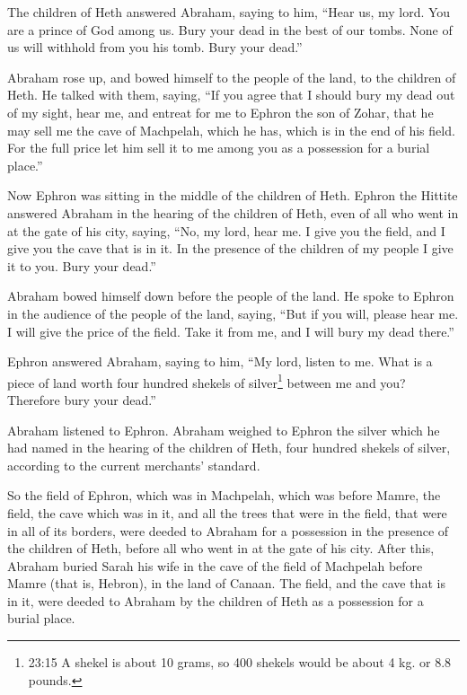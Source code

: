 \myverse{}The children of Heth answered Abraham, saying to him, \myverse{}“Hear us, my lord. You are a prince of God among us. Bury your dead in the best of our tombs. None of us will withhold from you his tomb. Bury your dead.”

\myverse{}Abraham rose up, and bowed himself to the people of the land, to the children of Heth. \myverse{}He talked with them, saying, “If you agree that I should bury my dead out of my sight, hear me, and entreat for me to Ephron the son of Zohar, \myverse{}that he may sell me the cave of Machpelah, which he has, which is in the end of his field. For the full price let him sell it to me among you as a possession for a burial place.”

\myverse{}Now Ephron was sitting in the middle of the children of Heth. Ephron the Hittite answered Abraham in the hearing of the children of Heth, even of all who went in at the gate of his city, saying, \myverse{}“No, my lord, hear me. I give you the field, and I give you the cave that is in it. In the presence of the children of my people I give it to you. Bury your dead.”

\myverse{}Abraham bowed himself down before the people of the land. \myverse{}He spoke to Ephron in the audience of the people of the land, saying, “But if you will, please hear me. I will give the price of the field. Take it from me, and I will bury my dead there.”

\myverse{}Ephron answered Abraham, saying to him, \myverse{}“My lord, listen to me. What is a piece of land worth four hundred shekels of silver\footnote{23:15 A shekel is about 10 grams, so 400 shekels would be about 4 kg. or 8.8 pounds.} between me and you? Therefore bury your dead.”

\myverse{}Abraham listened to Ephron. Abraham weighed to Ephron the silver which he had named in the hearing of the children of Heth, four hundred shekels of silver, according to the current merchants’ standard.

\myverse{}So the field of Ephron, which was in Machpelah, which was before Mamre, the field, the cave which was in it, and all the trees that were in the field, that were in all of its borders, were deeded \myverse{}to Abraham for a possession in the presence of the children of Heth, before all who went in at the gate of his city. \myverse{}After this, Abraham buried Sarah his wife in the cave of the field of Machpelah before Mamre (that is, Hebron), in the land of Canaan. \myverse{}The field, and the cave that is in it, were deeded to Abraham by the children of Heth as a possession for a burial place.

